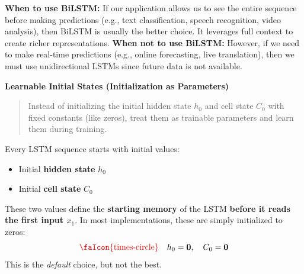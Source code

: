 \highspace
\textcolor{Green3}{ \textbf{When to use BiLSTM:}} If our application allows us to see the entire sequence before making predictions (e.g., text classification, speech recognition, video analysis), then BiLSTM is usually the better choice. It leverages full context to create richer representations. \textcolor{Red2}{ \textbf{When not to use BiLSTM:}} However, if we need to make real-time predictions (e.g., online forecasting, live translation), then we must use unidirectional LSTMs since future data is not available.

\newpage

\begin{flushleft}
    \textcolor{Green3}{ \textbf{Learnable Initial States (Initialization as Parameters)}}
\end{flushleft}
\begin{quote}
     Instead of initializing the initial hidden state $h_0$ and cell state $C_0$ with fixed constants (like zeros), treat them as trainable parameters and learn them during training.
\end{quote}
Every LSTM sequence starts with initial values:
\begin{itemize}
    \item Initial \textbf{hidden state} $h_0$
    \item Initial \textbf{cell state} $C_0$
\end{itemize}
These two values define the \textbf{starting memory} of the LSTM \textbf{before it reads the first input $x_1$}. In most implementations, these are simply initialized to zeros:
\begin{equation*}
    \textcolor{Red2}{\text{\faIcon{times-circle}}} \quad h_0 = \mathbf{0}, \quad C_0 = \mathbf{0}
\end{equation*}
This is the \emph{default} choice, but not the best.

